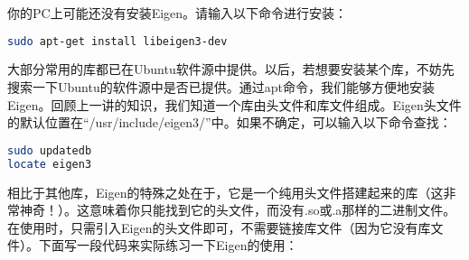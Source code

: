 你的PC上可能还没有安装Eigen。请输入以下命令进行安装：
\begin{lstlisting}[language=sh,caption=终端输入：]
sudo apt-get install libeigen3-dev
\end{lstlisting}

大部分常用的库都已在Ubuntu软件源中提供。以后，若想要安装某个库，不妨先搜索一下Ubuntu的软件源中是否已提供。通过apt命令，我们能够方便地安装Eigen。回顾上一讲的知识，我们知道一个库由头文件和库文件组成。Eigen头文件的默认位置在“/usr/include/eigen3/”中。如果不确定，可以输入以下命令查找：
\begin{lstlisting}[language=sh,caption=终端输入：]
sudo updatedb
locate eigen3
\end{lstlisting}
相比于其他库，Eigen的特殊之处在于，它是一个纯用头文件搭建起来的库（这非常神奇！）。这意味着你只能找到它的头文件，而没有.so或.a那样的二进制文件。在使用时，只需引入Eigen的头文件即可，不需要链接库文件（因为它没有库文件）。下面写一段代码来实际练习一下Eigen的使用：

